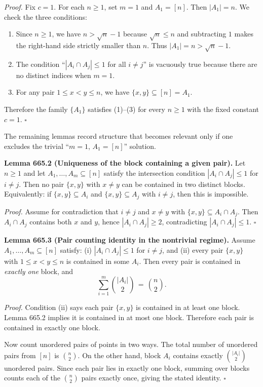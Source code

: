\noindent\emph{Proof.}
Fix $c=1$. For each $n\ge 1$, set $m=1$ and $A_1=[n]$.
Then $|A_1|=n$.
We check the three conditions:
\begin{enumerate}
\item Since $n\ge 1$, we have $n>\sqrt{n}-1$ because $\sqrt n\le n$ and subtracting $1$ makes the right-hand side strictly smaller than $n$.
Thus $|A_1|=n>\sqrt n-1$.
\item The condition ``$|A_i\cap A_j|\le 1$ for all $i\ne j$'' is vacuously true because there are no distinct indices when $m=1$.
\item For any pair $1\le x<y\le n$, we have $\{x,y\}\subseteq [n]=A_1$.
\end{enumerate}
Therefore the family $\{A_1\}$ satisfies (1)--(3) for every $n\ge 1$ with the fixed constant $c=1$.
\hfill$\square$

\medskip
The remaining lemmas record structure that becomes relevant only if one excludes the trivial ``$m=1$, $A_1=[n]$'' solution.

\medskip
\noindent\textbf{Lemma 665.2 (Uniqueness of the block containing a given pair).}
Let $n\ge 1$ and let $A_1,\dots,A_m\subseteq [n]$ satisfy the intersection condition $|A_i\cap A_j|\le 1$ for $i\ne j$.
Then no pair $\{x,y\}$ with $x\ne y$ can be contained in two distinct blocks.
Equivalently: if $\{x,y\}\subseteq A_i$ and $\{x,y\}\subseteq A_j$ with $i\ne j$, then this is impossible.

\noindent\emph{Proof.}
Assume for contradiction that $i\ne j$ and $x\ne y$ with $\{x,y\}\subseteq A_i\cap A_j$.
Then $A_i\cap A_j$ contains both $x$ and $y$, hence $|A_i\cap A_j|\ge 2$, contradicting $|A_i\cap A_j|\le 1$.
\hfill$\square$

\medskip
\noindent\textbf{Lemma 665.3 (Pair counting identity in the nontrivial regime).}
Assume $A_1,\dots,A_m\subseteq [n]$ satisfy:
(i) $|A_i\cap A_j|\le 1$ for $i\ne j$, and
(ii) every pair $\{x,y\}$ with $1\le x<y\le n$ is contained in some $A_i$.
Then every pair is contained in \emph{exactly one} block, and
\[
\sum_{i=1}^m \binom{|A_i|}{2} \,=\, \binom{n}{2}.
\]

\noindent\emph{Proof.}
Condition (ii) says each pair $\{x,y\}$ is contained in at least one block.
Lemma 665.2 implies it is contained in at most one block.
Therefore each pair is contained in exactly one block.

Now count unordered pairs of points in two ways.
The total number of unordered pairs from $[n]$ is $\binom n2$.
On the other hand, block $A_i$ contains exactly $\binom{|A_i|}{2}$ unordered pairs.
Since each pair lies in exactly one block, summing over blocks counts each of the $\binom n2$ pairs exactly once, giving the stated identity.
\hfill$\square$

